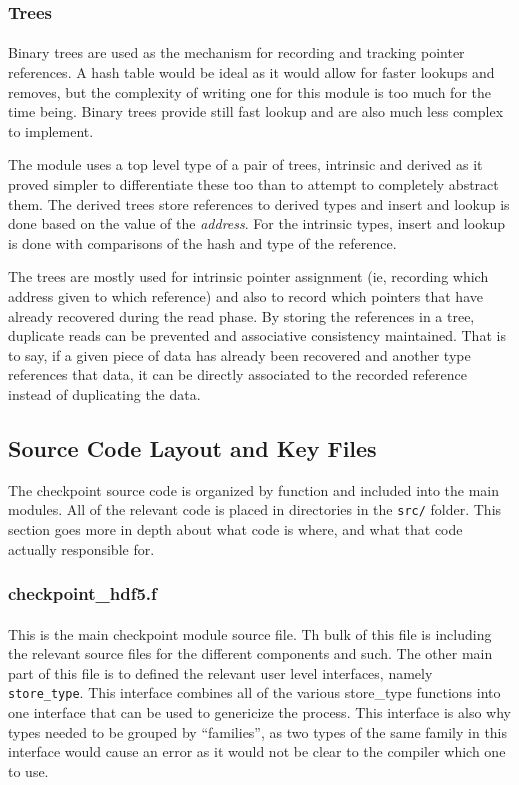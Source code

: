 \documentclass{article}
\begin{document}
\subsubsection{Trees}
\paragraph{}
Binary trees are used as the mechanism for recording and tracking pointer references. A hash table would be ideal as it would allow for faster lookups and removes, but the complexity of writing one for this module is too much for the time being. Binary trees provide still fast lookup and are also much less complex to implement.

The module uses a top level type of a pair of trees, intrinsic and derived as it proved simpler to differentiate these too than to attempt to completely abstract them. The derived trees store references to derived types and insert and lookup is done based on the value of the \emph{address}. For the intrinsic types, insert and lookup is done with comparisons of the hash and type of the reference.

The trees are mostly used for intrinsic pointer assignment (ie, recording which address given to which reference) and also to record which pointers that have already recovered during the read phase. By storing the references in a tree, duplicate reads can be prevented and associative consistency maintained. That is to say, if a given piece of data has already been recovered and another type references that data, it can be directly associated to the recorded reference instead of duplicating the data.

\subsection{Source Code Layout and Key Files}
The checkpoint source code is organized by function and included into the main modules. All of the relevant code is placed in directories in the \texttt{src/} folder. This section goes more in depth about what code is where, and what that code actually responsible for.

\subsubsection{checkpoint\_hdf5.f}
\paragraph{}
This is the main checkpoint module source file. Th bulk of this file is including the relevant source files for the different components and such. The other main part of this file is to defined the relevant user level interfaces, namely \texttt{store\_type}. This interface combines all of the various store\_type functions into one interface that can be used to genericize the process. This interface is also why types needed to be grouped by ``families'', as two types of the same family in this interface would cause an error as it would not be clear to the compiler which one to use.
\end{document}
